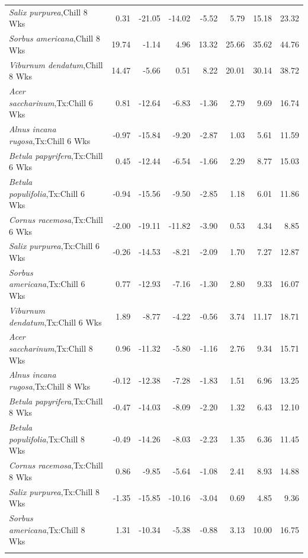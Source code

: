 \documentclass{article}\usepackage[]{graphicx}\usepackage[]{color}
\begin{document}
\begin{longtable}{lrrrrrrr}
  \textit{Salix purpurea},Chill 8 Wks & 0.31 & -21.05 & -14.02 & -5.52 & 5.79 & 15.18 & 23.32 \\ 
  \textit{Sorbus americana},Chill 8 Wks & 19.74 & -1.14 & 4.96 & 13.32 & 25.66 & 35.62 & 44.76 \\ 
  \textit{Viburnum dendatum},Chill 8 Wks & 14.47 & -5.66 & 0.51 & 8.22 & 20.01 & 30.14 & 38.72 \\ 
  \textit{Acer saccharinum},Tx:Chill 6 Wks & 0.81 & -12.64 & -6.83 & -1.36 & 2.79 & 9.69 & 16.74 \\ 
  \textit{Alnus incana rugosa},Tx:Chill 6 Wks & -0.97 & -15.84 & -9.20 & -2.87 & 1.03 & 5.61 & 11.59 \\ 
  \textit{Betula papyrifera},Tx:Chill 6 Wks & 0.45 & -12.44 & -6.54 & -1.66 & 2.29 & 8.77 & 15.03 \\ 
  \textit{Betula populifolia},Tx:Chill 6 Wks & -0.94 & -15.56 & -9.50 & -2.85 & 1.18 & 6.01 & 11.86 \\ 
  \textit{Cornus racemosa},Tx:Chill 6 Wks & -2.00 & -19.11 & -11.82 & -3.90 & 0.53 & 4.34 & 8.85 \\ 
  \textit{Salix purpurea},Tx:Chill 6 Wks & -0.26 & -14.53 & -8.21 & -2.09 & 1.70 & 7.27 & 12.87 \\ 
  \textit{Sorbus americana},Tx:Chill 6 Wks & 0.77 & -12.93 & -7.16 & -1.30 & 2.80 & 9.33 & 16.07 \\ 
  \textit{Viburnum dendatum},Tx:Chill 6 Wks & 1.89 & -8.77 & -4.22 & -0.56 & 3.74 & 11.17 & 18.71 \\ 
  \textit{Acer saccharinum},Tx:Chill 8 Wks & 0.96 & -11.32 & -5.80 & -1.16 & 2.76 & 9.34 & 15.71 \\ 
  \textit{Alnus incana rugosa},Tx:Chill 8 Wks & -0.12 & -12.38 & -7.28 & -1.83 & 1.51 & 6.96 & 13.25 \\ 
  \textit{Betula papyrifera},Tx:Chill 8 Wks & -0.47 & -14.03 & -8.09 & -2.20 & 1.32 & 6.43 & 12.10 \\ 
  \textit{Betula populifolia},Tx:Chill 8 Wks & -0.49 & -14.26 & -8.03 & -2.23 & 1.35 & 6.36 & 11.45 \\ 
  \textit{Cornus racemosa},Tx:Chill 8 Wks & 0.86 & -9.85 & -5.64 & -1.08 & 2.41 & 8.93 & 14.88 \\ 
  \textit{Salix purpurea},Tx:Chill 8 Wks & -1.35 & -15.85 & -10.16 & -3.04 & 0.69 & 4.85 & 9.36 \\ 
  \textit{Sorbus americana},Tx:Chill 8 Wks & 1.31 & -10.34 & -5.38 & -0.88 & 3.13 & 10.00 & 16.75 \\ 
   \hline
\hline
\label{tab:suppmodthick}
\end{longtable}
\end{document}
